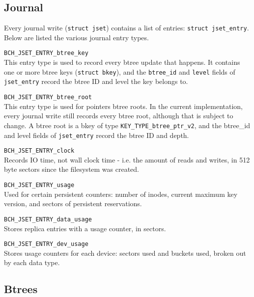 \documentclass{article}
\begin{document}
\subsection{Journal}

Every journal write (\texttt{struct jset}) contains a list of entries:
\texttt{struct jset\_entry}. Below are listed the various journal entry types.

\begin{description}
	\item \texttt{BCH\_JSET\_ENTRY\_btree\_key} \\
		This entry type is used to record every btree update that
		happens. It contains one or more btree keys (\texttt{struct
		bkey}), and the \texttt{btree\_id} and \texttt{level} fields of
		\texttt{jset\_entry} record the btree ID and level the key
		belongs to.

	\item \texttt{BCH\_JSET\_ENTRY\_btree\_root} \\
		This entry type is used for pointers btree roots. In the current
		implementation, every journal write still records every btree
		root, although that is subject to change. A btree root is a bkey
		of type \texttt{KEY\_TYPE\_btree\_ptr\_v2}, and the btree\_id
		and level fields of \texttt{jset\_entry} record the btree ID and
		depth.

	\item \texttt{BCH\_JSET\_ENTRY\_clock} \\
		Records IO time, not wall clock time - i.e. the amount of reads
		and writes, in 512 byte sectors since the filesystem was
		created.

	\item \texttt{BCH\_JSET\_ENTRY\_usage} \\
		Used for certain persistent counters: number of inodes, current
		maximum key version, and sectors of persistent reservations.

	\item \texttt{BCH\_JSET\_ENTRY\_data\_usage} \\
		Stores replica entries with a usage counter, in sectors.

	\item \texttt{BCH\_JSET\_ENTRY\_dev\_usage} \\
		Stores usage counters for each device: sectors used and buckets
		used, broken out by each data type.
\end{description}

\subsection{Btrees}
\end{document}
